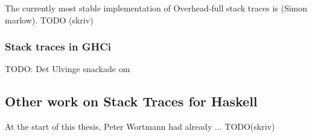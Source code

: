 The currently most stable implementation of Overhead-full stack traces is
(Simon marlow). TODO (skriv) %

\subsubsection{Stack traces in GHCi}

TODO: Det Ulvinge snackade om

\subsection{Other work on Stack Traces for Haskell}

At the start of this thesis, Peter Wortmann had already ... TODO(skriv) %
